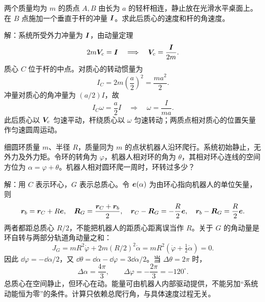 \begin{example}[受冲量的双质点杆]
两个质量均为 $m$ 的质点 $A,B$ 由长为 $a$ 的轻杆相连，静止放在光滑水平桌面上。在 $B$ 点施加一个垂直于杆的冲量 $\boldsymbol{I}$。求此后质心的速度和杆的角速度。

\begin{center}
\end{center}

解：系统所受外力冲量为 $\boldsymbol{I}$，由动量定理
\[
2m\boldsymbol{V}_c=\boldsymbol{I}\quad\Longrightarrow\quad
\boldsymbol{V}_c=\frac{\boldsymbol{I}}{2m}.
\]
质心 $C$ 位于杆的中点。对质心的转动惯量为
\[
I_C=2m\left(\frac{a}{2}\right)^2=\frac{ma^2}{2}.
\]
冲量对质心的角冲量为 $(a/2)I$，故
\[
I_C\omega=\frac{a}{2}I
\quad\Longrightarrow\quad
\omega=\frac{I}{ma}.
\]
此后质心以 $\boldsymbol{V}_c$ 匀速平动，杆绕质心以 $\omega$ 匀速转动；两质点相对质心的位置矢量作匀速圆周运动。
\end{example}

\begin{example}
细圆环质量 $m$、半径 $R$，质量同为 $m$ 的点状机器人沿环爬行。系统初始静止，无外力及外力矩。令环的转角为 $\varphi$，机器人相对环的角为 $\theta$，其相对环心连线的空间方位为 $\alpha=\varphi+\theta$。机器人相对圆环爬一周时，环转过多少？

解：用 $C$ 表示环心，$G$ 表示总质心。令 $\boldsymbol{e}(\alpha)$ 为由环心指向机器人的单位矢量，则
\[
\boldsymbol{r}_b=\boldsymbol{r}_C+R\boldsymbol{e},\quad
\boldsymbol{R}_G=\frac{\boldsymbol{r}_C+\boldsymbol{r}_b}{2},\quad
\boldsymbol{r}_C-\boldsymbol{R}_G=-\frac R2\boldsymbol{e},\quad
\boldsymbol{r}_b-\boldsymbol{R}_G=\frac R2\boldsymbol{e}.
\]
两者都距总质心 $R/2$，不能把机器人的距质心距离误当作 $R$。关于 $G$ 的角动量是环自转与两部分轨道角动量之和：
\[
J_G=mR^2\dot\varphi+2m(R/2)^2\dot\alpha
=mR^2\left(\dot\varphi+\tfrac12\dot\alpha\right)=0.
\]
因此 $\dd\varphi=-\dd\alpha/2$，又 $\dd\theta=\dd\alpha-\dd\varphi=3\dd\alpha/2$。当 $\Delta\theta=2\pi$ 时，
\[
\boxed{\Delta\alpha=\frac{4\pi}{3},\qquad
\Delta\varphi=-\frac{2\pi}{3}=-120^\circ.}
\]
总质心在空间静止，但环心在动。能量可由机器人内部驱动提供，不能另加“系统动能恒为零”的条件。计算只依赖总爬行角，与具体速度过程无关。
\begin{center}
\end{center}
\end{example}

